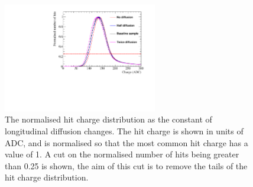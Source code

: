 \begin{figure}
  \centering
  \includegraphics[width=0.6\textwidth]{Canvas_ChargeCut_Diffusion}
  \caption[The normalised hit charge distribution as the constant of longitudinal diffusion changes]
          {The normalised hit charge distribution as the constant of longitudinal diffusion changes. The hit charge is shown in units of ADC, and is normalised so that the most common hit charge has a value of 1. A cut on the normalised number of hits being greater than 0.25 is shown, the aim of this cut is to remove the tails of the hit charge distribution.}
  \label{fig:DiffLDiff_ChargeCut}
\end{figure}

